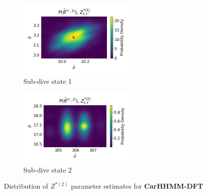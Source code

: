 \documentclass[12pt]{TD-CJS}
\begin{document}
\begin{figure}[ht]
	\centering
	\begin{subfigure}[t]{0.45\textwidth}
        \centering
        \includegraphics[width=2.25in]{../Plots/hhmm_FV_MLE_density_FoVeDBA_0_0.png}
        \caption{Sub-dive state 1}
    \end{subfigure}
    \begin{subfigure}[t]{0.45\textwidth}
        \centering
        \includegraphics[width=2.25in]{../Plots/hhmm_FV_MLE_density_FoVeDBA_0_1.png}
        \caption{Sub-dive state 2}
    \end{subfigure}
    \caption{Distribution of $Z^{*(2)}$ parameter estimates for \textbf{CarHHMM-DFT}}
\end{figure}

\end{document}

